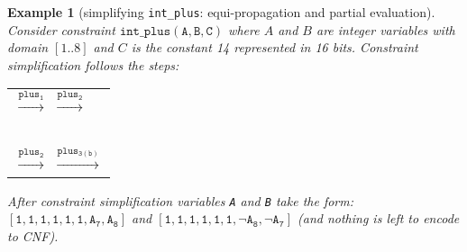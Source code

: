 \documentclass{tlp}
\newtheorem{example}[theorem]{Example}
\begin{document}
\begin{example}[simplifying \texttt{int\_plus}: equi-propagation and
  partial evaluation]\label{ex:plus14}
  Consider constraint $\mathtt{int\_plus(A,B,C)}$ where $A$ and $B$
  are integer variables with domain $[1..8]$ and $C$ is the constant
  14 represented in 16 bits. Constraint simplification follows the
  steps:

\medskip
\begin{tabular}{l}
\fbox{$\begin{array}{l}
\mathtt{int\_plus(}\\
~~\mathtt{[1,A_2,A_3,A_4,A_5,A_6,A_7,A_8],} \\
~~\mathtt{[1,B_2,B_3,B_4,B_5,B_6,B_7,B_8],}\\
~~\mathtt{[\underbrace{1,\qquad\ldots\ldots~\quad,1}_{14
    ~times},0,0]}\\
\mathtt{)}
\end{array}$} 
$\xrightarrow{\mathtt{plus_1}}$
\fbox{$\begin{array}{l}
\mathtt{int\_plus(}\\
~~\mathtt{[1,1,1,1,1,1,A_7,A_8],} \\
~~\mathtt{[1,1,1,1,1,1,B_7,B_8],}\\
~~\mathtt{[\underbrace{1,\quad\ldots\ldots~~,1}_{14 ~times},0,0]}\\
\mathtt{)}
\end{array}$}
$\xrightarrow{\mathtt{plus_{2}}}$ 
\\ ~\\
$\xrightarrow{\mathtt{plus_{2}}}$
\fbox{\texttt{int\_plus}$\left(\begin{array}{l}
\mathtt{[A_7,A_8],~} 
\mathtt{[B_7,B_8],}\\
\mathtt{[1,1,0,0]}
\end{array}\right)$}
$\xrightarrow{\mathtt{plus_{3(b)}}}$
\fbox{
  $\begin{array}{l}
    \mathtt{none}, ~binding:  \\
     \mathtt{B_7=\neg A_8,~B_8=\neg A_7})
  \end{array}$

} 
\end{tabular}

\medskip\noindent After constraint simplification
variables \texttt{A} and \texttt{B} take the form: $\mathtt{[1, 1, 1,
  1, 1, 1, A_{7}, A_{8}]}$ and $\mathtt{[1, 1, 1, 1, 1,
  1,\neg A_{8}, \neg A_{7}]}$ (and nothing is left to encode to CNF).

\end{example}
\end{document}

